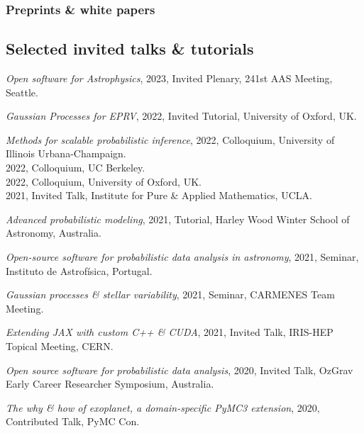 \documentclass[12pt,letterpaper]{article}
\begin{document}
  \subsubsection{Preprints \& white papers}
  \begin{list}{}{\cvlist}
    
  \end{list}
\fi

\subsection{Selected invited talks \& tutorials}
\begin{list}{}{\cvlist}

  \item \emph{Open software for Astrophysics},
      2023, Invited Plenary, 241st AAS Meeting, Seattle.

  \item \emph{Gaussian Processes for EPRV},
      2022, Invited Tutorial, University of Oxford, UK.

  \item \emph{Methods for scalable probabilistic inference},
      2022, Colloquium, University of Illinois Urbana-Champaign.\\
      2022, Colloquium, UC Berkeley.\\
      2022, Colloquium, University of Oxford, UK.\\
      2021, Invited Talk, Institute for Pure \& Applied Mathematics, UCLA.

  \item \emph{Advanced probabilistic modeling},
      2021, Tutorial, Harley Wood Winter School of Astronomy, Australia.

  \item \emph{Open-source software for probabilistic data analysis in astronomy},
      2021, Seminar, Instituto de Astrof\'isica, Portugal.

  \item \emph{Gaussian processes \& stellar variability},
      2021, Seminar, CARMENES Team Meeting.

  \item \emph{Extending JAX with custom C++ \& CUDA},
        2021, Invited Talk, IRIS-HEP Topical Meeting, CERN.

  \item \emph{Open source software for probabilistic data analysis},
        2020, Invited Talk, OzGrav Early Career Researcher Symposium, Australia.

  \item \emph{The why \& how of exoplanet, a domain-specific PyMC3 extension},
        2020, Contributed Talk, PyMC Con.


\end{list}
\end{document}
